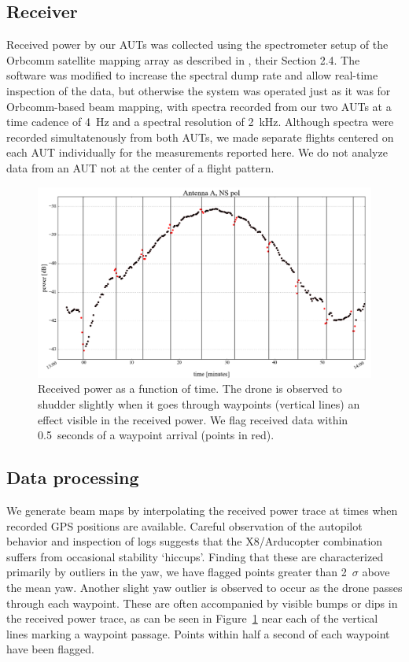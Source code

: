 \documentclass[preprint2,numberedappendix,tighten,twocolappendix]{aastex6}
\begin{document}
\subsection{Receiver}

Received power by our AUTs was collected using the spectrometer setup of the Orbcomm satellite mapping array as described in \citet{2016:NebenHERAdish}, their Section 2.4. The software was modified  to increase the spectral dump rate and allow real-time inspection of the data, but otherwise the system was operated just as it was for Orbcomm-based beam mapping, with spectra recorded from our two AUTs at a time cadence of 4~Hz and a spectral resolution of 2~kHz.   Although spectra were recorded simultatenously from both AUTs, we made separate flights centered on each AUT individually for the measurements reported here.  We do not analyze data from an AUT not at the center of a flight pattern.

\begin{figure}[htb]
\includegraphics[width=\columnwidth]{figures/GB_waypoint_flagging_zoom.png}
\caption{Received power as a function of time. The drone is observed to shudder slightly when it goes through waypoints (vertical lines) an effect visible in the received power. We flag received data within 0.5~seconds of a waypoint arrival (points in red).}
\label{fig:waypoint_flagging}
\end{figure}


\subsection{Data processing}
\label{sec:processing}

We generate beam maps by interpolating the received power trace at times when recorded GPS positions are available.  Careful observation of the autopilot behavior and inspection of logs suggests that the X8/Arducopter combination suffers from occasional stability `hiccups'. Finding that these are characterized primarily by outliers in the yaw, we have flagged points greater than 2~$\sigma$ above the mean yaw.  Another slight yaw outlier is observed to occur as the drone passes through each waypoint.  These are often accompanied by visible bumps or dips in the received power trace, as can be seen in Figure~\ref{fig:waypoint_flagging} near each of the vertical lines marking a waypoint passage.  Points within half a second of each waypoint have been flagged.
\end{document}
